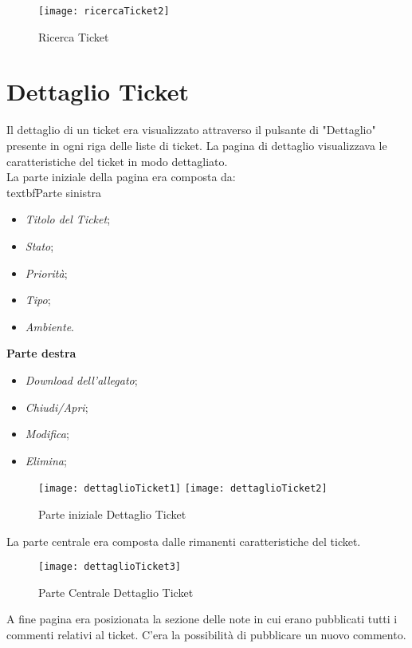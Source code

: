 \begin{figure}[H]
\bigskip
     \texttt{[image: ricercaTicket2]} 
    \caption{Ricerca Ticket}
\end{figure}

\bigskip
\section{Dettaglio Ticket}
Il dettaglio di un ticket era visualizzato attraverso il pulsante di "Dettaglio" presente in ogni riga delle liste di ticket. La pagina di dettaglio visualizzava le caratteristiche del ticket in modo dettagliato. \\ 
La parte iniziale della pagina era composta da:\
\medskip
\\textbf{Parte sinistra}
\begin{itemize}
\item \textit{Titolo del Ticket};
\item \textit{Stato};
\item \textit{Priorità};
\item \textit{Tipo};
\item \textit{Ambiente}.
\end{itemize}

\medskip
\noindent
\textbf{Parte destra}
\begin{itemize}
\item \textit{Download dell'allegato};
\item \textit{Chiudi/Apri};
\item \textit{Modifica};
\item \textit{Elimina};
\end{itemize}
\bigskip
\bigskip
\begin{figure}[H]
	\centering
	    \texttt{[image: dettaglioTicket1]} 
     \texttt{[image: dettaglioTicket2]} 
    \caption{Parte iniziale Dettaglio Ticket}
\end{figure}


\noindent
La parte centrale era composta dalle rimanenti caratteristiche del ticket.\\
\bigskip
\begin{figure}[H]
	\centering
    \texttt{[image: dettaglioTicket3]} 
\caption{Parte Centrale Dettaglio Ticket}
\end{figure}

\noindent
A fine pagina era posizionata la sezione delle note in cui erano pubblicati tutti i commenti relativi al ticket. C'era la possibilità di pubblicare un nuovo commento. 


